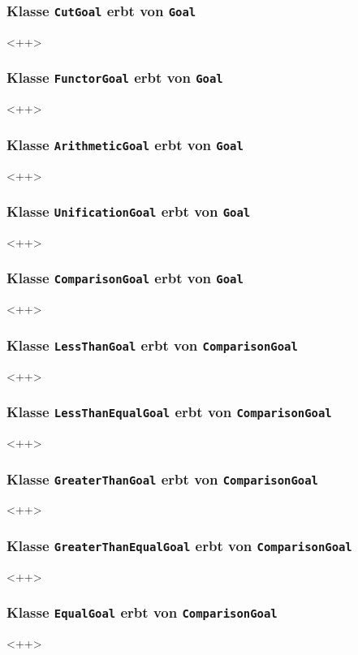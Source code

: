 \documentclass[parskip=full,11pt,twoside]{scrartcl}
\begin{document}
\subsubsection{Klasse \texttt{CutGoal} erbt von \texttt{Goal}}
<++>

\subsubsection{Klasse \texttt{FunctorGoal} erbt von \texttt{Goal}}
<++>

\subsubsection{Klasse \texttt{ArithmeticGoal} erbt von \texttt{Goal}}
<++>

\subsubsection{Klasse \texttt{UnificationGoal} erbt von \texttt{Goal}}
<++>

\subsubsection{Klasse \texttt{ComparisonGoal} erbt von \texttt{Goal}}
<++>
\subsubsection{Klasse \texttt{LessThanGoal} erbt von \texttt{ComparisonGoal}}
<++>

\subsubsection{Klasse \texttt{LessThanEqualGoal} erbt von \texttt{ComparisonGoal}}
<++>

\subsubsection{Klasse \texttt{GreaterThanGoal} erbt von \texttt{ComparisonGoal}}
<++>

\subsubsection{Klasse \texttt{GreaterThanEqualGoal} erbt von \texttt{ComparisonGoal}}
<++>

\subsubsection{Klasse \texttt{EqualGoal} erbt von \texttt{ComparisonGoal}}
<++>
\end{document}
